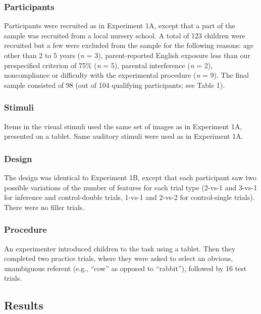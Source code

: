 \documentclass{rsos}
\begin{document}
\subsubsection{Participants}\label{participants-2}

Participants were recruited as in Experiment 1A, except that a part of
the sample was recruited from a local nursery school. A total of 123
children were recruited but a few were excluded from the sample for the
following reasons: age other than 2 to 5 years (\emph{n} = 3),
parent-reported English exposure less than our prespecified criterion of
75\% (\emph{n} = 5), parental interference (\emph{n} = 2), noncompliance
or difficulty with the experimental procedure (\emph{n} = 9). The final
sample consisted of 98 (out of 104 qualifying participants; see Table
1).

\subsubsection{Stimuli}\label{stimuli-1}

Items in the visual stimuli used the same set of images as in Experiment
1A, presented on a tablet. Same auditory stimuli were used as in
Experiment 1A.

\subsubsection{Design}\label{design}

The design was identical to Experiment 1B, except that each participant
saw two possible variations of the number of features for each trial
type (2-vs-1 and 3-vs-1 for inference and control-double trials, 1-vs-1
and 2-vs-2 for control-single trials). There were no filler trials.

\subsubsection{Procedure}\label{procedure-1}

An experimenter introduced children to the task using a tablet. Then
they completed two practice trials, where they were asked to select an
obvious, unambiguous referent (e.g., ``cow'' as opposed to ``rabbit''),
followed by 16 test trials.

\subsection{Results}\label{results-1}
\end{document}
